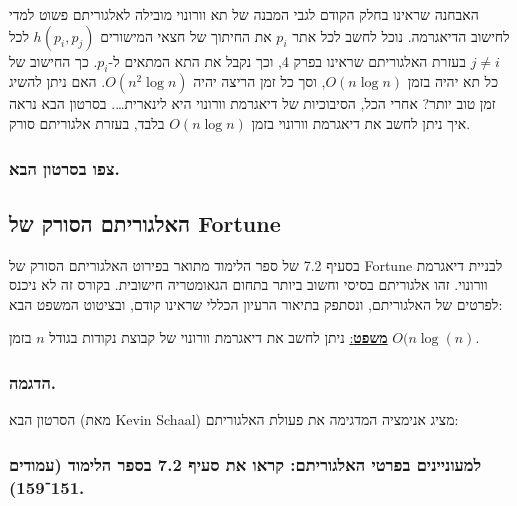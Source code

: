 \documentclass[
]{book}
\begin{document}
האבחנה שראינו בחלק הקודם לגבי המבנה של תא וורונוי מובילה לאלגוריתם פשוט למדי לחישוב הדיאגרמה. נוכל לחשב לכל אתר \(p_i\) את החיתוך של חצאי המישורים \(h(p_i,p_j)\) לכל \(j\neq i\) בעזרת האלגוריתם שראינו בפרק 4, וכך נקבל את התא המתאים ל-\(p_i\). כך החישוב של כל תא יהיה בזמן \(O(n\log n)\), וסך כל זמן הריצה יהיה \(O(n^2 \log n)\). האם ניתן להשיג זמן טוב יותר? אחרי הכל, הסיבוכיות של דיאגרמת וורונוי היא לינארית\ldots.
בסרטון הבא נראה איך ניתן לחשב את דיאגרמת וורונוי בזמן \(O(n\log n)\) בלבד, בעזרת אלגוריתם סורק.

\hypertarget{ux5e6ux5e4ux5d5-ux5d1ux5e1ux5e8ux5d8ux5d5ux5df-ux5d4ux5d1ux5d0.-5}{%
\subsubsection{צפו בסרטון הבא.}\label{ux5e6ux5e4ux5d5-ux5d1ux5e1ux5e8ux5d8ux5d5ux5df-ux5d4ux5d1ux5d0.-5}}

\hypertarget{ux5d4ux5d0ux5dcux5d2ux5d5ux5e8ux5d9ux5eaux5dd-ux5d4ux5e1ux5d5ux5e8ux5e7-ux5e9ux5dc-fortune}{%
\subsection{האלגוריתם הסורק של Fortune}\label{ux5d4ux5d0ux5dcux5d2ux5d5ux5e8ux5d9ux5eaux5dd-ux5d4ux5e1ux5d5ux5e8ux5e7-ux5e9ux5dc-fortune}}

בסעיף 7.2 של ספר הלימוד מתואר בפירוט האלגוריתם הסורק של Fortune לבניית דיאגרמת וורונוי. זהו אלגוריתם בסיסי וחשוב ביותר בתחום הגאומטריה חישובית. בקורס זה לא ניכנס לפרטים של האלגוריתם, ונסתפק בתיאור הרעיון הכללי שראינו קודם, ובציטוט המשפט הבא:

\ul{\textbf{משפט}:} ניתן לחשב את דיאגרמת וורונוי של קבוצת נקודות בגודל \(n\) בזמן \(O(n\log(n)\).

\hypertarget{ux5d4ux5d3ux5d2ux5deux5d4.}{%
\subsubsection*{הדגמה.}\label{ux5d4ux5d3ux5d2ux5deux5d4.}}

הסרטון הבא (מאת Kevin Schaal) מציג אנימציה המדגימה את פעולת האלגוריתם:

\hypertarget{ux5dcux5deux5e2ux5d5ux5e0ux5d9ux5d9ux5e0ux5d9ux5dd-ux5d1ux5e4ux5e8ux5d8ux5d9-ux5d4ux5d0ux5dcux5d2ux5d5ux5e8ux5d9ux5eaux5dd-ux5e7ux5e8ux5d0ux5d5-ux5d0ux5ea-ux5e1ux5e2ux5d9ux5e3-7.2-ux5d1ux5e1ux5e4ux5e8-ux5d4ux5dcux5d9ux5deux5d5ux5d3-ux5e2ux5deux5d5ux5d3ux5d9ux5dd-151159.}{%
\subsubsection*{למעוניינים בפרטי האלגוריתם: קראו את סעיף 7.2 בספר הלימוד (עמודים 151־159).}\label{ux5dcux5deux5e2ux5d5ux5e0ux5d9ux5d9ux5e0ux5d9ux5dd-ux5d1ux5e4ux5e8ux5d8ux5d9-ux5d4ux5d0ux5dcux5d2ux5d5ux5e8ux5d9ux5eaux5dd-ux5e7ux5e8ux5d0ux5d5-ux5d0ux5ea-ux5e1ux5e2ux5d9ux5e3-7.2-ux5d1ux5e1ux5e4ux5e8-ux5d4ux5dcux5d9ux5deux5d5ux5d3-ux5e2ux5deux5d5ux5d3ux5d9ux5dd-151159.}}
\end{document}
